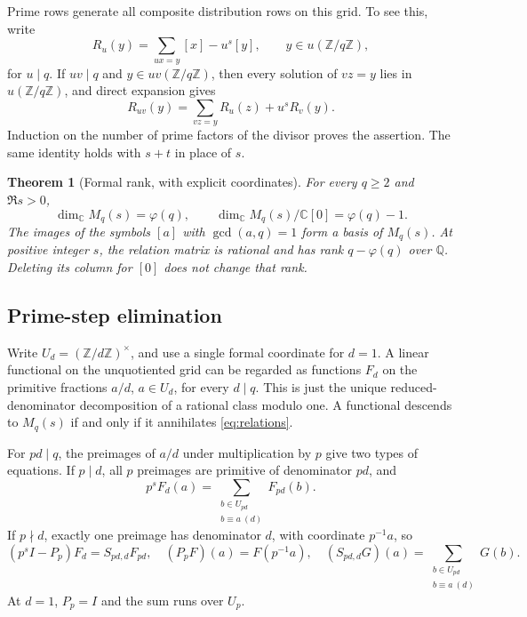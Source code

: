 \documentclass[11pt]{article}
\newtheorem{theorem}{Theorem}[section]
\theoremstyle{definition}
\theoremstyle{remark}
\newcommand{\CC}{\mathbb C}
\newcommand{\QQ}{\mathbb Q}
\newcommand{\ZZ}{\mathbb Z}
\begin{document}
Prime rows generate all composite distribution rows on this grid. To see this, write
\[
 R_u(y)=\sum_{ux=y}[x]-u^s[y],\qquad y\in u(\ZZ/q\ZZ),
\]
for $u\mid q$. If $uv\mid q$ and $y\in uv(\ZZ/q\ZZ)$, then every solution of $vz=y$ lies in $u(\ZZ/q\ZZ)$, and direct expansion gives
\[
 R_{uv}(y)=\sum_{vz=y}R_u(z)+u^sR_v(y).
\]
Induction on the number of prime factors of the divisor proves the assertion. The same identity holds with $s+t$ in place of $s$.

\begin{theorem}[Formal rank, with explicit coordinates]\label{thm:rank}
For every $q\geq2$ and $\Re s>0$,
\begin{equation}\label{eq:rank}
 \dim_\CC M_q(s)=\varphi(q),\qquad
 \dim_\CC M_q(s)/\CC[0]=\varphi(q)-1.
\end{equation}
The images of the symbols $[a]$ with $\gcd(a,q)=1$ form a basis of $M_q(s)$. At positive integer $s$, the relation matrix is rational and has rank $q-\varphi(q)$ over $\QQ$. Deleting its column for $[0]$ does not change that rank.
\end{theorem}

\subsection{Prime-step elimination}
Write $U_d=(\ZZ/d\ZZ)^\times$, and use a single formal coordinate for $d=1$. A linear functional on the unquotiented grid can be regarded as functions $F_d$ on the primitive fractions $a/d$, $a\in U_d$, for every $d\mid q$. This is just the unique reduced-denominator decomposition of a rational class modulo one. A functional descends to $M_q(s)$ if and only if it annihilates \eqref{eq:relations}.

For $pd\mid q$, the preimages of $a/d$ under multiplication by $p$ give two types of equations. If $p\mid d$, all $p$ preimages are primitive of denominator $pd$, and
\begin{equation}\label{eq:prime-div}
 p^s F_d(a)=\sum_{\substack{b\in U_{pd}\\b\equiv a\ (d)}}F_{pd}(b).
\end{equation}
If $p\nmid d$, exactly one preimage has denominator $d$, with coordinate $p^{-1}a$, so
\begin{equation}\label{eq:prime-new}
 (p^s I-P_p)F_d=S_{pd,d}F_{pd},
 \quad (P_pF)(a)=F(p^{-1}a),\quad
 (S_{pd,d}G)(a)=\sum_{\substack{b\in U_{pd}\\b\equiv a\ (d)}}G(b).
\end{equation}
At $d=1$, $P_p=I$ and the sum runs over $U_p$.
\end{document}
